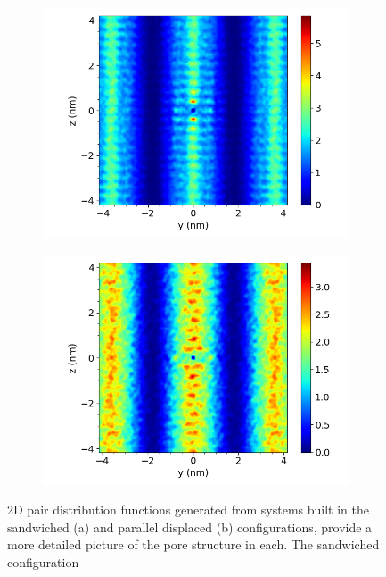 \documentclass[journal=jpcbfk,manusciprt=article]{achemso}
\begin{document}
  \begin{figure}
  \centering
  \begin{subfigure}{0.45\textwidth}
	\centering
	\includegraphics[width=\textwidth]{layered_yz_correlation.png}
	\caption{}\label{fig:layered_yz_correlation}
  \end{subfigure}
  \begin{subfigure}{0.45\textwidth}
        \centering
        \includegraphics[width=\textwidth]{offset_yz_correlation.png}
        \caption{}\label{fig:offset_yz_correlation}
  \end{subfigure}
  \caption{2D pair distribution functions generated from systems built in the 
	   sandwiched (a) and parallel displaced (b) configurations, provide
           a more detailed picture of the pore structure in each. The sandwiched
	   configuration}\label{fig:yz_correlation}
  \end{figure} 
\end{document}
